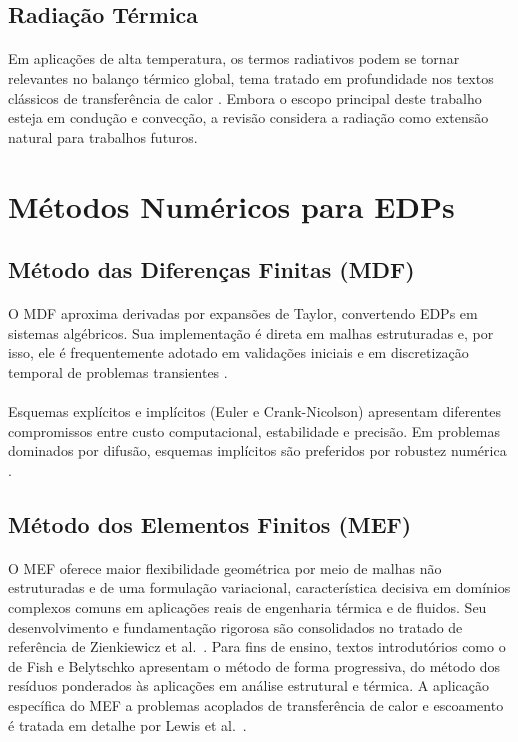 \subsection{Radiação Térmica}
\paragraph{}Em aplicações de alta temperatura, os termos radiativos podem se tornar relevantes no balanço térmico global, tema tratado em profundidade nos textos clássicos de transferência de calor \cite{Incropera2006}. Embora o escopo principal deste trabalho esteja em condução e convecção, a revisão considera a radiação como extensão natural para trabalhos futuros.

\section{Métodos Numéricos para EDPs}

\subsection{Método das Diferenças Finitas (MDF)}
\paragraph{}O MDF aproxima derivadas por expansões de Taylor, convertendo EDPs em sistemas algébricos. Sua implementação é direta em malhas estruturadas e, por isso, ele é frequentemente adotado em validações iniciais e em discretização temporal de problemas transientes \cite{Patankar1980}.

\paragraph{}Esquemas explícitos e implícitos (Euler e Crank-Nicolson) apresentam diferentes compromissos entre custo computacional, estabilidade e precisão. Em problemas dominados por difusão, esquemas implícitos são preferidos por robustez numérica \cite{Versteeg2007}.

\subsection{Método dos Elementos Finitos (MEF)}
\paragraph{}O MEF oferece maior flexibilidade geométrica por meio de malhas não estruturadas e de uma formulação variacional, característica decisiva em domínios complexos comuns em aplicações reais de engenharia térmica e de fluidos. Seu desenvolvimento e fundamentação rigorosa são consolidados no tratado de referência de Zienkiewicz et al.\ \cite{Zienkiewicz2013}. Para fins de ensino, textos introdutórios como o de Fish e Belytschko \cite{Fish2007} apresentam o método de forma progressiva, do método dos resíduos ponderados às aplicações em análise estrutural e térmica. A aplicação específica do MEF a problemas acoplados de transferência de calor e escoamento é tratada em detalhe por Lewis et al.\ \cite{Lewis2004}.

